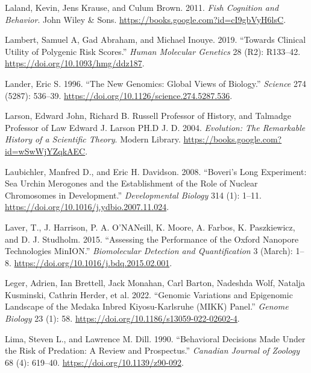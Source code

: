 \documentclass[
]{book}
\newlength{\cslhangindent}
\newlength{\cslentryspacingunit} %
\newenvironment{CSLReferences}[2] %
 {%
  \setlength{\parindent}{0pt}
  \ifodd #1
  \let\oldpar\par
  \def\par{\hangindent=\cslhangindent\oldpar}
  \fi
  \setlength{\parskip}{#2\cslentryspacingunit}
 }%
 {}
\begin{document}
\begin{CSLReferences}{1}{0}
\leavevmode{}%
Laland, Kevin, Jens Krause, and Culum Brown. 2011. \emph{Fish {Cognition} and {Behavior}}. {John Wiley \& Sons}. \url{https://books.google.com?id=cI9gbVyH6lsC}.

\leavevmode{}%
Lambert, Samuel A, Gad Abraham, and Michael Inouye. 2019. {``Towards Clinical Utility of Polygenic Risk Scores.''} \emph{Human Molecular Genetics} 28 (R2): R133--42. \url{https://doi.org/10.1093/hmg/ddz187}.

\leavevmode{}%
Lander, Eric S. 1996. {``The {New Genomics}: {Global Views} of {Biology}.''} \emph{Science} 274 (5287): 536--39. \url{https://doi.org/10.1126/science.274.5287.536}.

\leavevmode{}%
Larson, Edward John, Richard B. Russell Professor of History, and Talmadge Professor of Law Edward J. Larson PH.D J. D. 2004. \emph{Evolution: {The Remarkable History} of a {Scientific Theory}}. {Modern Library}. \url{https://books.google.com?id=wSwWjYZqkAEC}.

\leavevmode{}%
Laubichler, Manfred D., and Eric H. Davidson. 2008. {``Boveri's Long Experiment: {Sea} Urchin Merogones and the Establishment of the Role of Nuclear Chromosomes in Development.''} \emph{Developmental Biology} 314 (1): 1--11. \url{https://doi.org/10.1016/j.ydbio.2007.11.024}.

\leavevmode{}%
Laver, T., J. Harrison, P. A. O'NANeill, K. Moore, A. Farbos, K. Paszkiewicz, and D. J. Studholm. 2015. {``Assessing the Performance of the {Oxford Nanopore Technologies MinION}.''} \emph{Biomolecular Detection and Quantification} 3 (March): 1--8. \url{https://doi.org/10.1016/j.bdq.2015.02.001}.

\leavevmode{}%
Leger, Adrien, Ian Brettell, Jack Monahan, Carl Barton, Nadeshda Wolf, Natalja Kusminski, Cathrin Herder, et al. 2022. {``Genomic Variations and Epigenomic Landscape of the {Medaka Inbred Kiyosu-Karlsruhe} ({MIKK}) Panel.''} \emph{Genome Biology} 23 (1): 58. \url{https://doi.org/10.1186/s13059-022-02602-4}.

\leavevmode{}%
Lima, Steven L., and Lawrence M. Dill. 1990. {``Behavioral Decisions Made Under the Risk of Predation: A Review and Prospectus.''} \emph{Canadian Journal of Zoology} 68 (4): 619--40. \url{https://doi.org/10.1139/z90-092}.


\end{CSLReferences}
\end{document}
